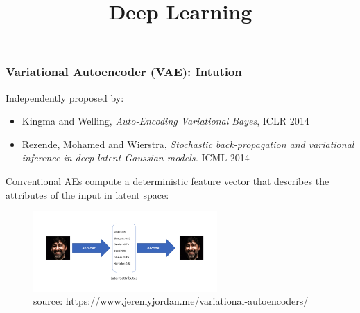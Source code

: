 




\title{Deep Learning}

\date{}


\newcommand{\titlefigure}{plots/frontpage.png}

\newcommand{\learninggoals}{
  \item introduction and intution of VAE
  \item VAE-parameter fitting
  \item reparametrization trick
}



\begin{frame}
\frametitle{Variational Autoencoder (VAE): Intution}

Independently proposed by:
\small{
\begin{itemize}
\item Kingma and Welling, \emph{Auto-Encoding Variational Bayes}, ICLR 2014
\item Rezende, Mohamed and Wierstra, \emph{Stochastic back-propagation and variational inference in deep latent Gaussian models.} ICML 2014
\end{itemize}}

\vspace{1mm}

Conventional AEs compute a deterministic feature vector that describes the attributes of the input in latent space:

                \begin{figure}
                \centering
                \includegraphics[width=7cm]{plots/ae_intution.png}
                \vspace{-8pt}
                \caption{\tiny{source: https://www.jeremyjordan.me/variational-autoencoders/}}
                \end{figure}
    
\end{frame}


